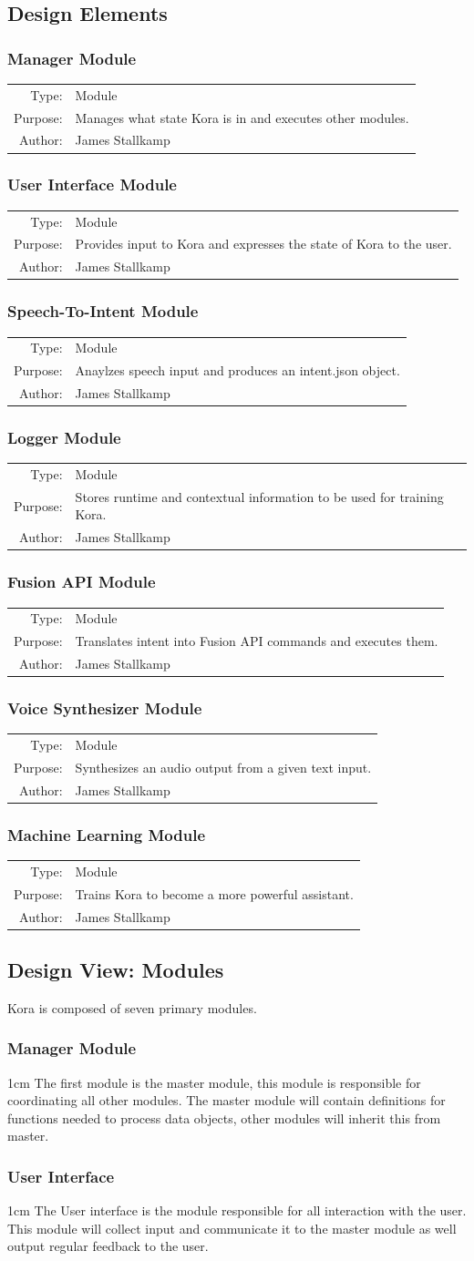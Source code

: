 \documentclass[onecolumn, draftclsnofoot,10pt, compsoc]{IEEEtran}
\def \botname{Kora\xspace}
\newenvironment{indentItem}[1][1cm]{\begin{adjustwidth}{#1}{}}{\end{adjustwidth}}
\newcommand{\designElementDef}[4]{
    \subsubsection{#1}
    \begin{tabular}[t]{r p{6in}}
        Type: & #2 \\
        Purpose: & #3 \\
        Author: & #4 \\
    \end{tabular}
}
\begin{document}
    \subsection{Design Elements} 
        \designElementDef{Manager Module}
                         {Module}
                         {Manages what state \botname is in and executes other modules.}
                         {James Stallkamp}
        \designElementDef{User Interface Module}
                         {Module}
                         {Provides input to \botname and expresses the state of \botname to the user.}
                         {James Stallkamp}
        \designElementDef{Speech-To-Intent Module}
                         {Module}
                         {Anaylzes speech input and produces an intent.json object.}
                         {James Stallkamp}
        \designElementDef{Logger Module}
                         {Module}
                         {Stores runtime and contextual information to be used for training \botname.}
                         {James Stallkamp}
        \designElementDef{Fusion API Module}
                         {Module}
                         {Translates intent into Fusion API commands and executes them.}
                         {James Stallkamp}
        \designElementDef{Voice Synthesizer Module}
                         {Module}
                         {Synthesizes an audio output from a given text input.}
                         {James Stallkamp}
        \designElementDef{Machine Learning Module}
                         {Module}
                         {Trains \botname to become a more powerful assistant.}
                         {James Stallkamp}
						 
    \subsection{Design View: Modules}
		\botname is composed of seven primary modules.
		\subsubsection{Manager Module}
			\begin{indentItem}
				The first module is the master module, this module is responsible for coordinating all other modules.
				The master module will contain definitions for functions needed to process data objects, other modules will inherit this from master.
			\end{indentItem}
		\subsubsection{User Interface}
			\begin{indentItem}
				The User interface is the module responsible for all interaction with the user.
				This module will collect input and communicate it to the master module as well output regular feedback to the user.
			\end{indentItem}
\end{document}

